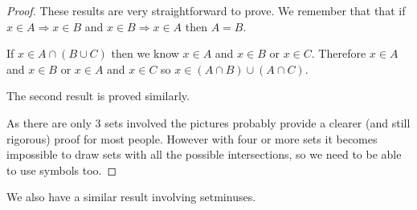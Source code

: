 \documentclass[
]{book}
\theoremstyle{definition}
\theoremstyle{definition}
\theoremstyle{definition}
\theoremstyle{definition}
\theoremstyle{remark}
\begin{document}
\begin{proof}
These results are very straightforward to prove. We remember that that if \(x \in A \Rightarrow x \in B\) and \(x \in B \Rightarrow x \in A\) then \(A = B\).

If \(x \in A \cap (B \cup C)\) then we know \(x \in A\) and \(x \in B\) or \(x \in C\). Therefore \(x \in A\) and \(x \in B\) or \(x \in A\) and \(x \in C\) so \(x \in (A\cap B) \cup (A \cap C)\).

The second result is proved similarly.

As there are only 3 sets involved the pictures probably provide a clearer (and still rigorous) proof for most people. However with four or more sets it becomes impossible to draw sets with all the possible intersections, so we need to be able to use symbols too.
\end{proof}

We also have a similar result involving setminuses.
\end{document}
